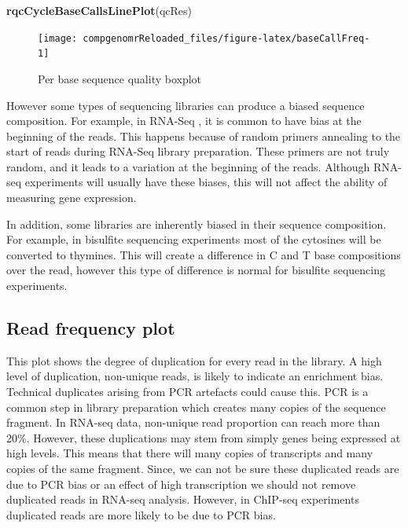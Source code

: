 \documentclass[12pt,]{krantz}
\newenvironment{Shaded}{\begin{snugshade}}{\end{snugshade}}
\newcommand{\KeywordTok}[1]{\textcolor[rgb]{0.13,0.29,0.53}{\textbf{#1}}}
\newcommand{\NormalTok}[1]{#1}
\begin{document}
\begin{Shaded}
\begin{Highlighting}[]
\KeywordTok{rqcCycleBaseCallsLinePlot}\NormalTok{(qcRes)}
\end{Highlighting}
\end{Shaded}

\begin{figure}

{\centering \texttt{[image: compgenomrReloaded\_files/figure-latex/baseCallFreq-1]} 

}

\caption{Per base sequence quality boxplot}\label{fig:baseCallFreq}
\end{figure}

However some types of sequencing libraries can produce a biased sequence composition. For example, in RNA-Seq , it is common to have bias at the beginning of the reads. This happens because of random primers annealing to the start of reads during RNA-Seq library preparation. These primers are not truly random, and it leads to a variation at the beginning of the reads. Although RNA-seq experiments will usually have these biases, this will not affect the ability of measuring gene expression.

In addition, some libraries are inherently biased in their sequence composition. For example, in bisulfite sequencing experiments most of the cytosines will be converted to thymines. This will create a difference in C and T base compositions over the read, however this type of difference is normal for bisulfite sequencing experiments.

\hypertarget{read-frequency-plot}{%
\subsection{Read frequency plot}\label{read-frequency-plot}}

This plot shows the degree of duplication for every read in the library. A high level of duplication, non-unique reads, is likely to indicate an enrichment bias. Technical duplicates arising from PCR artefacts could cause this. PCR is a common step in library preparation which creates many copies of the sequence fragment. In RNA-seq data, non-unique read proportion can reach more than 20\%. However, these duplications may stem from simply genes being expressed at high levels. This means that there will many copies of transcripts and many copies of the same fragment. Since, we can not be sure these duplicated reads are due to PCR bias or an effect of high transcription we should not remove duplicated reads in RNA-seq analysis. However, in ChIP-seq experiments duplicated reads are more likely to be due to PCR bias.
\end{document}
